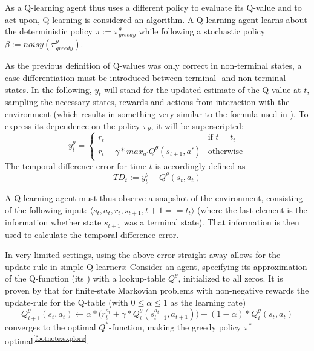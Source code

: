 As a Q-learning agent thus uses a different policy to evaluate its Q-value and to act upon, Q-learning is considered an  algorithm. A Q-learning agent learns about the deterministic policy $\pi := \pi^\theta_{greedy}$ while following a stochastic policy $\beta := noisy(\pi^\theta_{greedy})$.

As the previous definition of Q-values was only correct in non-terminal states, a case differentiation must be introduced between terminal- and non-terminal states. In the following, $y_t$ will stand for the updated estimate of the Q-value at $t$, sampling the necessary states, rewards and actions from interaction with the environment (which results in something very similar to the formula used in \cite{mnih_human-level_2015}). To express its dependence on the policy $\pi_\theta$, it will be superscripted:
\begin{equation} \label{eq:ycases}
	y_t^{\theta} = \begin{cases} 
		r_t & \text{if } t = t_t\\
		r_t + \gamma * max_{a'} Q^\theta( s_{t+1}, a') & \text{otherwise}
\end{cases}
\end{equation}
The temporal difference error for time $t$ is accordingly defined as 
\begin{equation}
TD_t := y_t^\theta - Q^\theta(s_t, a_t)
\end{equation}

A Q-learning agent must thus observe a snapshot of the environment, consisting of the following input: $\langle s_t, a_t, r_t, s_{t+1}, t+1==t_t \rangle$ (where the last element is the information whether state $s_{t+1}$ was a terminal state). That information is then used to calculate the temporal difference error.

In very limited settings, using the above error straight away allows for the update-rule in simple Q-learners: Consider an agent, specifying its approximation of the Q-function (its ) with a lookup-table $Q^\theta$, initialized to all zeros. It is proven by \cite{watkins_technical_1992} that for finite-state Markovian problems with non-negative rewards the update-rule for the Q-table (with $0 \leq \alpha \leq 1$ as the learning rate)
\begin{equation} \label{eq:qtable}
	Q^\theta_{i+1}(s_t,a_t) \leftarrow \alpha * \Big(r_t^{a_t} + \gamma * Q^\theta_i(s_{t+1}^{a_t},a_{t+1}) \Big) + (1-\alpha) * Q^\theta_i(s_t,a_t)
\end{equation}
converges to the optimal $Q^*$-function, making the greedy policy $\pi^*$ optimal\textsuperscript{\ref{footnote:explore}}. \\

